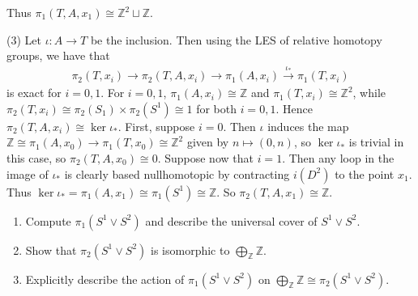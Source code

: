 \begin{solution}
    Thus $\pi_1 (T,A,x_1) \cong \mathbb{Z}^2 \sqcup \mathbb{Z}$.



        (3) Let
        $\iota \colon A \to T$ be the inclusion.
        Then using the LES of relative homotopy groups, we
        have that 
        \begin{align*}
            \pi_2 (T,x_i)
            \to \pi_2 \left( T,A, x_i \right) 
            \to \pi_1 \left( A,x_i \right) \stackrel{\iota_*}{\to} 
            \pi_1 \left( T,x_i \right) 
        \end{align*}
        is exact for $i = 0,1$.
        For $i=0,1$, 
        $\pi_1 (A,x_i) \cong \mathbb{Z}$ and
        $\pi_1 (T,x_i) \cong \mathbb{Z}^2$, while
        $\pi_2 \left( T,x_i \right) \cong
        \pi_2 \left( S_1 \right) \times 
        \pi_2 \left( S^{1} \right) \cong 1$ for
        both $i=0,1$.
        Hence
        $\pi_2 \left( T,A,x_i \right) \cong
        \ker \iota_*$.
        First, suppose $i = 0$. 
        Then $\iota$ induces the map
        $\mathbb{Z} \cong \pi_1 \left( A, x_0 \right) 
        \to \pi_1 \left( T, x_0 \right) \cong \mathbb{Z}^2$ 
        given by
        $n \mapsto \left( 0,n \right) $, so
        $\ker \iota_*$ is trivial in this case, so
        $\pi_2 \left( T, A, x_0 \right) \cong 0$.
        Suppose now that $i = 1$. Then
        any loop in the image of $\iota_*$ is clearly
        based nullhomotopic by contracting 
        $i(D^2)$ to the point $x_1$. Thus
        $\ker \iota_* =
        \pi_1 \left( A, x_1 \right) 
        \cong \pi_1 (S^{1}) \cong \mathbb{Z}$.
        So $\pi_2 \left( T,A,x_1 \right) \cong
        \mathbb{Z}$.
    \end{solution}


    \begin{problem}[]
        \begin{enumerate}
            \item Compute $\pi_1 \left( S^{1} \vee
                S^2\right) $ and describe the universal
                cover of $S^{1} \vee S^2$.
            \item Show that $\pi_2 \left( S^{1} \vee
                S^2 \right) $ is isomorphic
                to $\bigoplus_{\mathbb{Z}} \mathbb{Z}$.
            \item Explicitly describe the action of
                $\pi_1 \left( S^{1} \vee S^2 \right) $ on
                $\bigoplus_{\mathbb{Z}} \mathbb{Z} \cong
                \pi_2 \left( S^{1} \vee S^2 \right) $.
        \end{enumerate}
    \end{problem}

